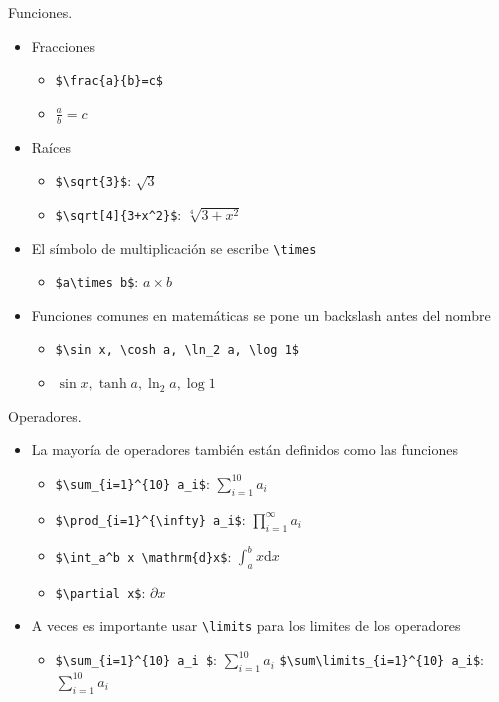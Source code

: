 \documentclass[dvipsnames,xcolor, handout]{beamer}
\theoremstyle{plain}
\theoremstyle{definition}
\begin{document}
\begin{frame}[fragile]{Funciones.}
\begin{itemize}
    \item Fracciones
    \begin{itemize}
        \item \verb!$\frac{a}{b}=c$!
        \item $\frac{a}{b}=c$
    \end{itemize}\pause
    \item Raíces
    \begin{itemize}
        \item \verb!$\sqrt{3}$!: $\sqrt{3}$
        \item \verb!$\sqrt[4]{3+x^2}$!: $\sqrt[4]{3+x^2}$
    \end{itemize}\pause
    \item El símbolo de multiplicación se escribe \verb!\times!
    \begin{itemize}
        \item \verb!$a\times b$!: $a\times b$
    \end{itemize}\pause
    \item Funciones comunes en matemáticas se pone un backslash antes del nombre
    \begin{itemize}
        \item \verb!$\sin x, \cosh a, \ln_2 a, \log 1$!
        \item $\sin x, \tanh a, \ln_2 a, \log 1$
    \end{itemize}
\end{itemize}
\end{frame}

\begin{frame}[fragile]{Operadores.}
\begin{itemize}
\item La mayoría de operadores también están definidos como las funciones
    \begin{itemize}
        \item \verb!$\sum_{i=1}^{10} a_i$!: $\sum_{i=1}^{10} a_i$
        \item \verb!$\prod_{i=1}^{\infty} a_i$!: $\prod_{i=1}^{\infty} a_i$
        \item \verb!$\int_a^b x \mathrm{d}x$!: $\int_a^b x\mathrm{d}x$
        \item \verb!$\partial x$!: $\partial x$
    \end{itemize}\pause
    \item A veces es importante usar \verb!\limits! para los limites de los operadores
    \begin{itemize}
        \item \verb!$\sum_{i=1}^{10} a_i $!: $\sum_{i=1}^{10} a_i $
        \verb!$\sum\limits_{i=1}^{10} a_i$!: $\sum\limits_{i=1}^{10} a_i$
    \end{itemize}
\end{itemize}
\end{frame}
\end{document}
